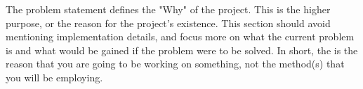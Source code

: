 The problem statement defines the "Why" of the project. This is the higher purpose, or the reason for the project's existence. This section should avoid mentioning implementation details, and focus more on what the current problem is and what would be gained if the problem were to be solved. In short, the is the reason that you are going to be working on something, not the method(s) that you will be employing.